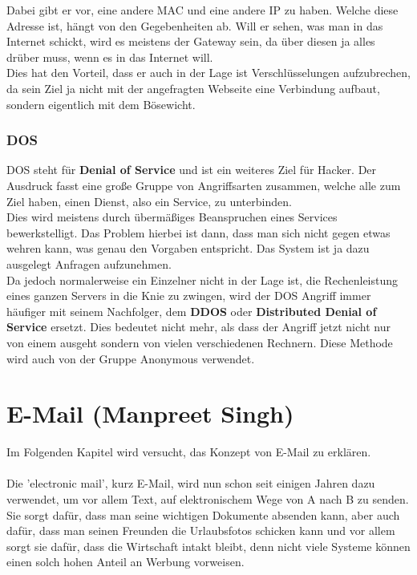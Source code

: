 \documentclass[12pt,a4paper]{report}
\begin{document}
\begin{onehalfspace}
Dabei gibt er vor, eine andere MAC und eine andere IP zu haben. Welche diese Adresse ist, hängt von den Gegebenheiten ab. Will er sehen, was man in das Internet schickt, wird es meistens der Gateway sein, da über diesen ja alles drüber muss, wenn es in das Internet will.\\
Dies hat den Vorteil, dass er auch in der Lage ist Verschlüsselungen aufzubrechen, da sein Ziel ja nicht mit der angefragten Webseite eine Verbindung aufbaut, sondern eigentlich mit dem Bösewicht. 

\subsection{DOS}
DOS steht für \textbf{Denial of Service} und ist ein weiteres Ziel für Hacker. Der Ausdruck fasst eine große Gruppe von Angriffsarten zusammen, welche alle zum Ziel haben, einen Dienst, also ein Service, zu unterbinden.\\
Dies wird meistens durch übermäßiges Beanspruchen eines Services bewerkstelligt. Das Problem hierbei ist dann, dass man sich nicht gegen etwas wehren kann, was genau den Vorgaben entspricht. Das System ist ja dazu ausgelegt Anfragen aufzunehmen.\\

Da jedoch normalerweise ein Einzelner nicht in der Lage ist, die Rechenleistung eines ganzen Servers in die Knie zu zwingen, wird der DOS Angriff immer häufiger mit seinem Nachfolger, dem \textbf{DDOS} oder \textbf{Distributed Denial of Service} ersetzt. Dies bedeutet nicht mehr, als dass der Angriff jetzt nicht nur von einem ausgeht sondern von vielen verschiedenen Rechnern. Diese Methode wird auch von der Gruppe Anonymous verwendet.
\newpage
{}
\chapter{E-Mail (Manpreet Singh)}
Im Folgenden Kapitel wird versucht, das Konzept von E-Mail zu erklären.\\\\
Die 'electronic mail', kurz E-Mail, wird nun schon seit einigen Jahren dazu verwendet, um vor allem Text, auf elektronischem Wege von A nach B zu senden. Sie sorgt dafür, dass man seine wichtigen Dokumente absenden kann, aber auch dafür, dass man seinen Freunden die Urlaubsfotos schicken kann und vor allem sorgt sie dafür, dass die Wirtschaft intakt bleibt, denn nicht viele Systeme können einen solch hohen Anteil an Werbung vorweisen. 

\end{onehalfspace}
\end{document}
